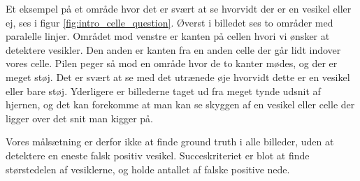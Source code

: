 Et eksempel på et område hvor det er svært at se hvorvidt der er en vesikel eller ej, ses i figur \ref{fig:intro_celle_question}. Øverst i billedet ses to områder med paralelle linjer. Området mod venstre er kanten på cellen hvori vi ønsker at detektere vesikler. Den anden er kanten fra en anden celle der går lidt indover vores celle. Pilen peger så mod en område hvor de to kanter mødes, og der er meget støj. Det er svært at se med det utrænede øje hvorvidt dette er en vesikel eller bare støj. Yderligere er billederne taget ud fra meget tynde udsnit af hjernen, og det kan forekomme at man kan se skyggen af en vesikel eller celle der ligger over det snit man kigger på.  

Vores målsætning er derfor ikke at finde ground truth i alle billeder, uden at detektere en eneste falsk positiv vesikel. Succeskriteriet er blot at finde størstedelen af vesiklerne, og holde antallet af falske positive nede.   



